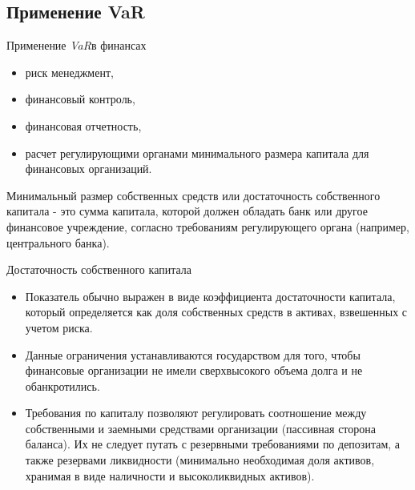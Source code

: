 \documentclass[financial_risks_lectures.tex]{subfiles}
\begin{document}
\subsection{Применение VaR}
\begin{frame}{Применение \textit{VaR}в финансах}

\begin{itemize}[<+->]
\item
риск менеджмент, 
\item
финансовый контроль, 
\item
финансовая отчетность,
\item
расчет регулирующими органами минимального размера капитала для финансовых организаций.
\end{itemize}
\end{frame}

\begin{frame}{}
\begin{block}{Минимальный размер собственных средств или достаточность собственного капитала}
\quad - это сумма капитала, которой должен обладать банк или другое финансовое учреждение, согласно требованиям регулирующего органа (например, центрального банка). 

\end{block}
\end{frame}

\begin{frame}[allowframebreaks]{Достаточность собственного капитала}
\begin{itemize}%
\item
Показатель обычно выражен в виде коэффициента достаточности капитала, который определяется как доля собственных средств в активах, взвешенных с учетом риска.
\item
Данные ограничения устанавливаются государством для того, чтобы финансовые организации не имели сверхвысокого объема долга и не обанкротились. 
\pagebreak
\item
Требования по капиталу позволяют регулировать соотношение между собственными и заемными средствами организации (пассивная сторона баланса). Их не следует путать с резервными требованиями по депозитам, а также резервами ликвидности (минимально необходимая доля активов, хранимая в виде наличности и высоколиквидных активов).
\end{itemize}
\end{frame}
\end{document}
